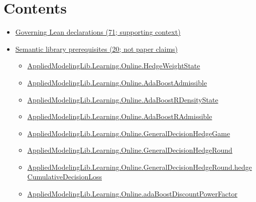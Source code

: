 \documentclass[10pt]{article}
\begin{document}
\section*{Contents}
\begin{itemize}[leftmargin=1.2em]
\item \hyperlink{governing-declaration-section-5ef5ef0364b6939c}{Governing Lean declarations (71; supporting context)}
\item \hyperlink{library-section-1c0611220923e58e}{Semantic library prerequisites (20; not paper claims)}
\begin{itemize}[leftmargin=1.2em]
\item \hyperlink{library-prerequisite-8196082d02788389}{Applied\allowbreak{}Modeling\allowbreak{}Lib.\allowbreak{}Learning.\allowbreak{}Online.\allowbreak{}Hedge\allowbreak{}Weight\allowbreak{}State}
\item \hyperlink{library-prerequisite-2771987b29f636cf}{Applied\allowbreak{}Modeling\allowbreak{}Lib.\allowbreak{}Learning.\allowbreak{}Online.\allowbreak{}Ada\allowbreak{}Boost\allowbreak{}Admissible}
\item \hyperlink{library-prerequisite-05718297c0c800e4}{Applied\allowbreak{}Modeling\allowbreak{}Lib.\allowbreak{}Learning.\allowbreak{}Online.\allowbreak{}Ada\allowbreak{}Boost\allowbreak{}R\allowbreak{}Density\allowbreak{}State}
\item \hyperlink{library-prerequisite-629f39db1994b79f}{Applied\allowbreak{}Modeling\allowbreak{}Lib.\allowbreak{}Learning.\allowbreak{}Online.\allowbreak{}Ada\allowbreak{}Boost\allowbreak{}R\allowbreak{}Admissible}
\item \hyperlink{library-prerequisite-34621c1fa332891f}{Applied\allowbreak{}Modeling\allowbreak{}Lib.\allowbreak{}Learning.\allowbreak{}Online.\allowbreak{}General\allowbreak{}Decision\allowbreak{}Hedge\allowbreak{}Game}
\item \hyperlink{library-prerequisite-578531041bcdb501}{Applied\allowbreak{}Modeling\allowbreak{}Lib.\allowbreak{}Learning.\allowbreak{}Online.\allowbreak{}General\allowbreak{}Decision\allowbreak{}Hedge\allowbreak{}Round}
\item \hyperlink{library-prerequisite-12ac34c217dfdfb1}{Applied\allowbreak{}Modeling\allowbreak{}Lib.\allowbreak{}Learning.\allowbreak{}Online.\allowbreak{}General\allowbreak{}Decision\allowbreak{}Hedge\allowbreak{}Round.\allowbreak{}hedge\allowbreak{}Cumulative\allowbreak{}Decision\allowbreak{}Loss}
\item \hyperlink{library-prerequisite-433d0fb0c63b6528}{Applied\allowbreak{}Modeling\allowbreak{}Lib.\allowbreak{}Learning.\allowbreak{}Online.\allowbreak{}ada\allowbreak{}Boost\allowbreak{}Discount\allowbreak{}Power\allowbreak{}Factor}

\end{itemize}
\end{itemize}
\end{document}
